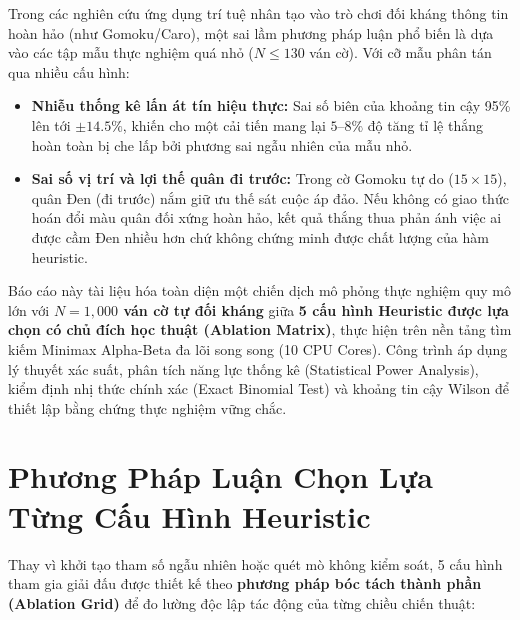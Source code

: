 \documentclass[11pt,a4paper]{article}
\begin{document}
Trong các nghiên cứu ứng dụng trí tuệ nhân tạo vào trò chơi đối kháng thông tin hoàn hảo (như Gomoku/Caro), một sai lầm phương pháp luận phổ biến là dựa vào các tập mẫu thực nghiệm quá nhỏ ($N \le 130$ ván cờ). Với cỡ mẫu phân tán qua nhiều cấu hình:
\begin{itemize}
    \item \textbf{Nhiễu thống kê lấn át tín hiệu thực:} Sai số biên của khoảng tin cậy 95\% lên tới $\pm 14.5\%$, khiến cho một cải tiến mang lại $5\text{--}8\%$ độ tăng tỉ lệ thắng hoàn toàn bị che lấp bởi phương sai ngẫu nhiên của mẫu nhỏ.
    \item \textbf{Sai số vị trí và lợi thế quân đi trước:} Trong cờ Gomoku tự do ($15 \times 15$), quân Đen (đi trước) nắm giữ ưu thế sát cuộc áp đảo. Nếu không có giao thức hoán đổi màu quân đối xứng hoàn hảo, kết quả thắng thua phản ánh việc ai được cầm Đen nhiều hơn chứ không chứng minh được chất lượng của hàm heuristic.
\end{itemize}

Báo cáo này tài liệu hóa toàn diện một chiến dịch mô phỏng thực nghiệm quy mô lớn với \textbf{$N = 1{,}000$ ván cờ tự đối kháng} giữa \textbf{5 cấu hình Heuristic được lựa chọn có chủ đích học thuật (Ablation Matrix)}, thực hiện trên nền tảng tìm kiếm Minimax Alpha-Beta đa lõi song song (10 CPU Cores). Công trình áp dụng lý thuyết xác suất, phân tích năng lực thống kê (Statistical Power Analysis), kiểm định nhị thức chính xác (Exact Binomial Test) và khoảng tin cậy Wilson để thiết lập bằng chứng thực nghiệm vững chắc.

\section{Phương Pháp Luận Chọn Lựa Từng Cấu Hình Heuristic}

Thay vì khởi tạo tham số ngẫu nhiên hoặc quét mò không kiểm soát, 5 cấu hình tham gia giải đấu được thiết kế theo \textbf{phương pháp bóc tách thành phần (Ablation Grid)} để đo lường độc lập tác động của từng chiều chiến thuật:
\end{document}

